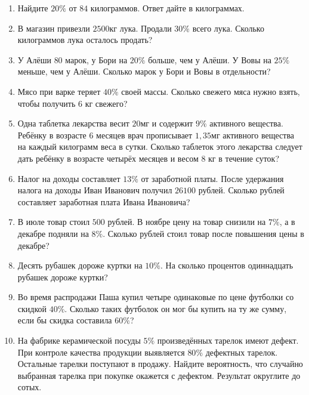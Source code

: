 \documentclass[12pt, a4paper]{article}
\begin{document}
	
	\begin{enumerate}
		\item Найдите $20\%$ от $84$ килограммов. Ответ дайте в килограммах.
		\item В магазин привезли $2500$кг лука. Продали $30\%$ всего лука. Сколько килограммов лука осталось продать?
		\item У Алёши $80$ марок, у Бори на $20\%$ больше, чем у Алёши. У Вовы на $25\%$ меньше, чем у Алёши. Сколько марок у Бори и Вовы в отдельности?
		\item Мясо при варке теряет $40\%$ своей массы. Сколько свежего мяса нужно взять, чтобы получить $6$ кг свежего?
		\item Одна таблетка лекарства весит $20$мг и содержит $9\%$ активного вещества. Ребёнку в возрасте $6$ месяцев врач прописывает $1,35$мг активного вещества на каждый килограмм веса в сутки. Сколько таблеток этого лекарства следует дать ребёнку в возрасте четырёх месяцев и весом 8 кг в течение суток?
		\item Налог на доходы составляет $13\%$ от заработной платы. После удержания налога на доходы Иван Иванович получил $26 100$ рублей. Сколько рублей составляет заработная плата Ивана Ивановича?
		\item В июле товар стоил $500$ рублей. В ноябре цену на товар снизили на $7\%$, а в декабре подняли на $8\%$. Сколько рублей стоил товар после повышения цены в декабре?
		\item Десять рубашек дороже куртки на $10\%$. На сколько процентов одиннадцать рубашек дороже куртки?
		\item Во время распродажи Паша купил четыре одинаковые по цене футболки со скидкой $40\%$. Сколько таких футболок он мог бы купить на ту же сумму, если бы скидка составила $60\%$?
		\item На фабрике керамической посуды $5\%$ произведённых тарелок имеют дефект. При контроле качества продукции выявляется $80\%$ дефектных тарелок. Остальные тарелки поступают в продажу. Найдите вероятность, что случайно выбранная тарелка при покупке окажется с дефектом. Результат округлите до сотых.
	\end{enumerate}
\end{document}
